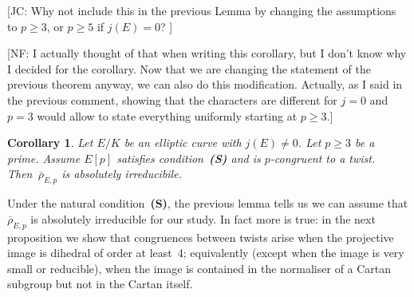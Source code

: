 \documentclass[12pt, reqno]{amsart}
\newcommand{\rhobar}{{\overline{\rho}}}
\numberwithin{equation}{section}
\newtheorem{corollary}[theorem]{Corollary}
\theoremstyle{definition}
\theoremstyle{remark}
\newcommand{\nf}[1]{{\color{blue} \textsf{[NF: #1]}}}
\newcommand{\jc}[1]{{\color{darkgreen} \textsf{[JC: #1]}}}
\begin{document}
\jc{Why not include this in the previous Lemma by changing the
  assumptions to $p\ge3$, or $p\ge5$ if $j(E)=0$?  }
  
\nf{I actually thought of that when writing this corollary, but I don't know why I decided for the corollary. Now that we are changing the statement of the previous theorem anyway, we can also do this modification. Actually, as I said in the previous comment, showing that the characters are different for $j=0$ and $p=3$ would allow to state everything uniformly starting at $p \geq 3$.}  

\begin{corollary}\label{C:noCyclic}
 Let $E/K$ be an elliptic curve with $j(E) \neq 0$. Let $p \geq 3$ be a prime.
Assume $E[p]$ satisfies condition~{\bf (S)} and is $p$-congruent to a twist. Then~$\rhobar_{E,p}$ is absolutely irreducibile.
\end{corollary}

Under the natural condition~{\bf (S)}, the 
previous lemma tells us we can assume
that $\rhobar_{E,p}$ is absolutely irreducible for our study. In fact more is true:
in the next proposition we show that congruences between 
twists arise when the projective image is dihedral of order at least~4; equivalently
(except when the image is very small or reducible), when the image is
contained in the normaliser of a Cartan subgroup but not in the Cartan
itself.
\end{document}
